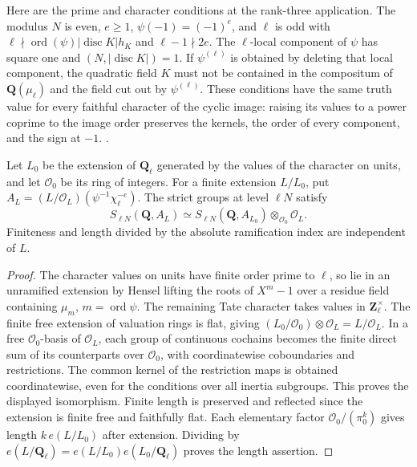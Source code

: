 Here are the prime and character conditions at the rank-three
application. The modulus \(N\) is even, \(e\ge1\),
\(\psi(-1)=(-1)^e\), and \(\ell\) is odd with
\(\ell\nmid\operatorname{ord}(\psi)|\operatorname{disc}K|h_K\) and
\(\ell-1\nmid 2e\). The \(\ell\)-local component of \(\psi\) has
square one and \((N,|\operatorname{disc}K|)=1\). If \(\psi^{(\ell)}\)
is obtained by deleting that local component, the quadratic field \(K\)
must not be contained in the compositum of \(\mathbf Q(\mu_\ell)\)
and the field cut out by \(\psi^{(\ell)}\). These conditions have the
same truth value for every faithful character of the cyclic image:
raising its values to a power coprime to the image order preserves
the kernels, the order of every component, and the sign at \(-1\).
.

\begin{lemma}\label{rk3:coeff}
Let \(L_0\) be the extension of \(\mathbf Q_\ell\) generated by the
values of the character on units, and let \(\mathcal O_0\) be its ring of integers.
For a finite extension \(L/L_0\), put \(A_L=(L/\mathcal O_L)
(\psi^{-1}\chi_\ell^{-e})\). The strict groups at level \(\ell N\)
satisfy
\[
 S_{\ell N}(\mathbf Q,A_L)\simeq
 S_{\ell N}(\mathbf Q,A_{L_0})\otimes_{\mathcal O_0}\mathcal O_L .
\]
Finiteness and length divided by the absolute ramification index
are independent of \(L\).
\end{lemma}
\begin{proof}
The character values on units have finite order prime to \(\ell\), so lie in
an unramified extension by Hensel lifting the roots of \(X^m-1\)
over a residue field containing \(\mu_m\), \(m=\operatorname{ord}\psi\).
The remaining Tate character takes values in \(\mathbf Z_\ell^\times\).
The finite free extension of valuation rings is flat, giving
\((L_0/\mathcal O_0)\otimes\mathcal O_L=L/\mathcal O_L\).
In a free \(\mathcal O_0\)-basis of \(\mathcal O_L\), each group of
continuous cochains becomes the finite direct sum of its counterparts
over \(\mathcal O_0\), with coordinatewise coboundaries and restrictions.
The common kernel of the restriction maps is obtained coordinatewise,
even for the conditions over all inertia subgroups. This proves the
displayed isomorphism. Finite length is preserved and reflected since
the extension is finite free and faithfully flat. Each elementary factor
\(\mathcal O_0/(\pi_0^k)\) gives length \(k\,e(L/L_0)\) after extension.
Dividing by \(e(L/\mathbf Q_\ell)=e(L/L_0)e(L_0/\mathbf Q_\ell)\)
proves the length assertion.
\end{proof}

